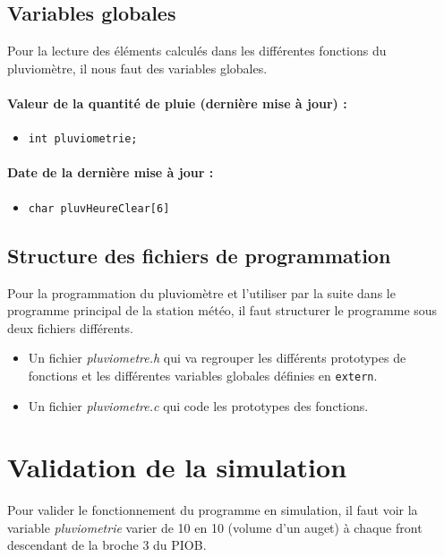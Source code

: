 \documentclass[a4paper]{report}
\begin{document}
\subsection{Variables globales}
Pour la lecture des éléments calculés dans les différentes fonctions du pluviomètre, il nous faut des variables globales.

\paragraph{Valeur de la quantité de pluie (dernière mise à jour) :}
\begin{itemize}
\item \texttt{int pluviometrie;}
\end{itemize}
\paragraph{Date de la dernière mise à jour :}
\begin{itemize}
\item \texttt{char pluvHeureClear[6]}
\end{itemize}

\subsection{Structure des fichiers de programmation}
Pour la programmation du pluviomètre et l’utiliser par la suite dans le programme principal de la station météo, il faut structurer le programme sous deux fichiers différents.
\begin{itemize}
\item Un fichier \emph{pluviometre.h} qui va regrouper les différents prototypes de fonctions et les différentes variables globales définies en \texttt{extern}.
\item Un fichier \emph{pluviometre.c} qui code les prototypes des fonctions.
\end{itemize}

\section{Validation de la simulation}
Pour valider le fonctionnement du programme en simulation, il faut voir la variable \emph{pluviometrie} varier de 10 en 10 (volume d’un auget) à chaque front descendant de la broche 3 du PIOB.
\end{document}
